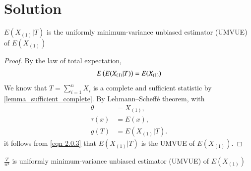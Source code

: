 \documentclass[journal,12pt,twocolumn]{IEEEtran}
\begin{document}
\section{Solution}
\begin{proposition} \label{prop_3.1}
$E(X_{(1)}|T)$ is the uniformly minimum-variance unbiased estimator (UMVUE) of $E(X_{(1)})$
\end{proposition}
\begin{proof}
By the law of total expectation, 
\begin{align}
\label{eqn 2.0.3}
E\left(E(X_{(1)} | T )\right) = E(X_{(1)})
\end{align}
We know that $T = \sum_{i=1}^n X_i$ is a complete and sufficient statistic by \ref{lemma_sufficient_complete}. By Lehmann–Scheffé theorem, with
\begin{align}
\theta &= X_{(1)},\\ 
\tau(x) &= E(x),\\
g(T) &= E(X_{(1)} | T).
\end{align}
it follows from \eqref{eqn 2.0.3} that $E(X_{(1)} | T)$ is the UMVUE of $E(X_{(1)})$.
\end{proof}
\begin{proposition} \label{prop_3.2}
$\frac{T}{n^2}$ is uniformly minimum-variance unbiased estimator (UMVUE) of $E(X_{(1)})$
\end{proposition}
\end{document}
